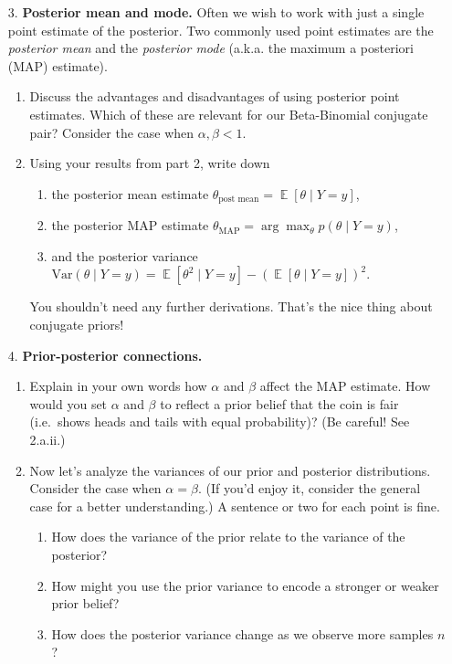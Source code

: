 \documentclass[submit]{harvardml}
\DeclareMathOperator*{\mean}{\mathbb{E}}
\begin{document}
\begin{framed}
\begin{enumerate}
  \item[3.]
    \textbf{Posterior mean and mode.} Often we wish to work with just a
    single point estimate of the posterior. Two commonly used point
    estimates are the \emph{posterior mean} and the \emph{posterior mode}
    (a.k.a. the maximum a posteriori (MAP) estimate).
  
    \begin{enumerate}
    \item
      Discuss the advantages and disadvantages of using posterior point
      estimates. Which of these are relevant for our Beta-Binomial conjugate pair? Consider the case when $\alpha, \beta < 1$.
    
    \item
      Using your results from part 2, write down
      
      \begin{enumerate}
        \item the posterior mean estimate \(\theta_{\text{post mean}} = \mean [\theta \mid Y = y]\),
        \item the posterior MAP estimate \(\theta_{\text{MAP}}=\arg \max_{\theta}p(\theta \mid Y=y)\),
        \item and the posterior variance $\mathrm{Var}(\theta \mid Y = y) = \mean[\theta^2 \mid Y = y] - (\mean[\theta \mid Y = y])^2$.
      \end{enumerate}
      
      You shouldn't need any further derivations. That's the nice thing about conjugate priors!
      
    \end{enumerate}

\item[4.]
    \textbf{Prior-posterior connections.}

    \begin{enumerate}
    \item
      Explain in your own words how \(\alpha\) and \(\beta\) affect the
      MAP estimate. How would you set \(\alpha\) and \(\beta\) to reflect
      a prior belief that the coin is fair (i.e.~shows heads and tails
      with equal probability)? (Be careful! See 2.a.ii.)

    \item Now let's analyze the variances of our prior and posterior distributions. Consider the case when $\alpha = \beta$. (If you'd enjoy it, consider the general case for a better understanding.) A sentence or two for each point is fine.
    \begin{enumerate}
      \item How does the variance of the prior relate to the variance of the posterior?
      \item How might you use the prior variance to encode a stronger or weaker prior belief?
      \item How does the posterior variance change as we observe more samples $n$?
    \end{enumerate}
    \end{enumerate}


\end{enumerate}
\end{framed}
\end{document}
